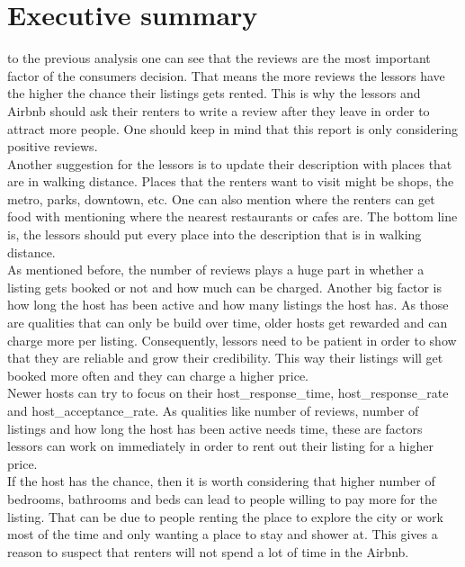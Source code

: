 
\section{Executive summary} %
 to the previous analysis one can see that the reviews are the most important factor of the consumers decision. That means the more reviews the lessors have the higher the chance their listings gets rented. This is why the lessors and Airbnb should ask their renters to write a review after they leave in order to attract more people. One should keep in mind that this report is only considering positive reviews. \\
Another suggestion for the lessors is to update their description with places that are in walking distance. Places that the renters want to visit might be shops, the metro, parks, downtown, etc. One can also mention where the renters can get food with mentioning where the nearest restaurants or cafes are. The bottom line is, the lessors should put every place into the description that is in walking distance. \\
As mentioned before, the number of reviews plays a huge part in whether a listing gets booked or not and how much can be charged. Another big factor is how long the host has been active and how many listings the host has. As those are qualities that can only be build over time, older hosts get rewarded and can charge more per listing. Consequently, lessors need to be patient in order to show that they are reliable and grow their credibility. This way their listings will get booked more often and they can charge a higher price. \\
Newer hosts can try to focus on their host\_response\_time, host\_response\_rate and host\_acceptance\_rate. As qualities like number of reviews, number of listings and how long the host has been active needs time, these are factors lessors can work on immediately in order to rent out their listing for a higher price. \\
If the host has the chance, then it is worth considering that higher number of bedrooms, bathrooms and beds can lead to people willing to pay more for the listing. That can be due to people renting the place to explore the city or work most of the time and only wanting a place to stay and shower at. This gives a reason to suspect that renters will not spend a lot of time in the Airbnb. 
